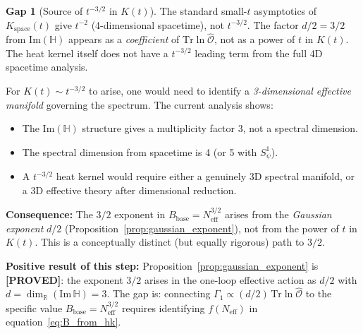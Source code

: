 \documentclass[11pt,a4paper]{article}
\theoremstyle{definition}
\newtheorem{gap}{Gap}
\theoremstyle{remark}
\begin{document}
\begin{gap}[Source of $t^{-3/2}$ in $K(t)$]
\label{gap:t32}
  The standard small-$t$ asymptotics of $K_{\mathrm{space}}(t)$ give
  $t^{-2}$ (4-dimensional spacetime), not $t^{-3/2}$.
  The factor $d/2 = 3/2$ from $\mathrm{Im}(\mathbb{H})$ appears as a
  \emph{coefficient} of $\mathrm{Tr}\ln\hat{\mathcal{O}}$,
  not as a power of $t$ in $K(t)$.
  The heat kernel itself does not have a $t^{-3/2}$ leading term
  from the full 4D spacetime analysis.

  For $K(t) \sim t^{-3/2}$ to arise, one would need to identify a
  \emph{3-dimensional effective manifold} governing the spectrum.
  The current analysis shows:
  \begin{itemize}
    \item The $\mathrm{Im}(\mathbb{H})$ structure gives a multiplicity factor 3,
      not a spectral dimension.
    \item The spectral dimension from spacetime is 4 (or 5 with $S^1_\psi$).
    \item A $t^{-3/2}$ heat kernel would require either a genuinely 3D
      spectral manifold, or a 3D effective theory after dimensional reduction.
  \end{itemize}

  \textbf{Consequence:} The $3/2$ exponent in $B_{\mathrm{base}} = N_{\mathrm{eff}}^{3/2}$
  arises from the \emph{Gaussian exponent} $d/2$ (Proposition~\ref{prop:gaussian_exponent}),
  not from the power of $t$ in $K(t)$.
  This is a conceptually distinct (but equally rigorous) path to $3/2$.
\end{gap}

\bigskip

\textbf{Positive result of this step:}
Proposition~\ref{prop:gaussian_exponent} is \textbf{[PROVED]}: the exponent $3/2$
arises in the one-loop effective action as $d/2$ with $d = \dim_\mathbb{R}(\mathrm{Im}\,\mathbb{H}) = 3$.
The gap is: connecting $\Gamma_1 \propto (d/2)\,\mathrm{Tr}\ln\hat{\mathcal{O}}$
to the specific value $B_{\mathrm{base}} = N_{\mathrm{eff}}^{3/2}$ requires
identifying $f(N_{\mathrm{eff}})$ in equation~\eqref{eq:B_from_hk}.

\ifdefined\INCLUDEMODE\else
\end{document}
